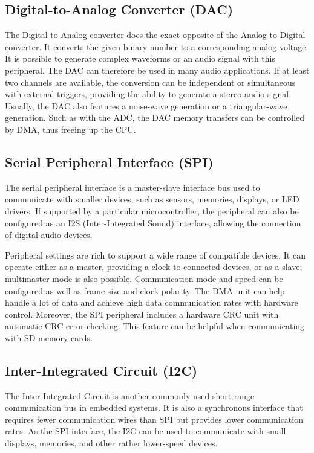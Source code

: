 	\subsection{Digital-to-Analog Converter (DAC)}
	\label{sub:dac}
The Digital-to-Analog converter does the exact opposite of the Analog-to-Digital converter. It converts the given binary number to a corresponding analog voltage. It is possible to generate complex waveforms or an audio signal with this peripheral. The DAC can therefore be used in many audio applications. If at least two channels are available, the conversion can be independent or simultaneous with external triggers, providing the ability to generate a stereo audio signal. Usually, the DAC also features a noise-wave generation or a triangular-wave generation. Such as with the ADC, the DAC memory transfers can be controlled by DMA, thus freeing up the CPU.

	\subsection{Serial Peripheral Interface (SPI)}
	\label{sub:spi}
The serial peripheral interface is a master-slave interface bus used to communicate with smaller devices, such as sensors, memories, displays, or LED drivers. If supported by a particular microcontroller, the peripheral can also be configured as an I2S (Inter-Integrated Sound) interface, allowing the connection of digital audio devices.

Peripheral settings are rich to support a wide range of compatible devices. It can operate either as a master, providing a clock to connected devices, or as a slave; multimaster mode is also possible. Communication mode and speed can be configured as well as frame size and clock polarity. The DMA unit can help handle a lot of data and achieve high data communication rates with hardware control. Moreover, the SPI peripheral includes a hardware CRC unit with automatic CRC error checking. This feature can be helpful when communicating with SD memory cards.

	\subsection{Inter-Integrated Circuit (I2C)}
	\label{sub:i2c}
The Inter-Integrated Circuit is another commonly used short-range communication bus in embedded systems. It is also a synchronous interface that requires fewer communication wires than SPI but provides lower communication rates. As the SPI interface, the I2C can be used to communicate with small displays, memories, and other rather lower-speed devices.

